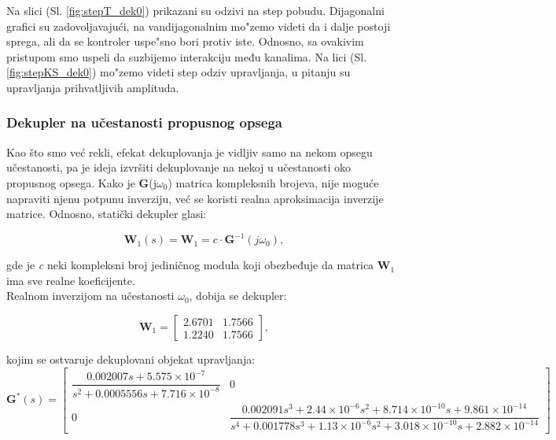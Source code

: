 \documentclass[a4paper,11pt]{article}
\theoremstyle{definition} \newtheorem{deff}{Definicija}[section]
\theoremstyle{definition} \newtheorem{prim}[deff]{Primer}
\theoremstyle{plain} \newtheorem{teor}[deff]{Teorema}
\begin{document}
	
	Na slici (Sl. \ref{fig:stepT_dek0}) prikazani su odzivi na step pobudu. Dijagonalni grafici su zadovoljavajući, na vandijagonalnim mo"zemo videti da i dalje postoji sprega, ali da se kontroler uspe"sno bori protiv iste. Odnosno, sa ovakivim pristupom smo uspeli da suzbijemo interakciju među kanalima. Na lici (Sl. \ref{fig:stepKS_dek0}) mo"zemo videti step odziv upravljanja, u pitanju su upravljanja prihvatljivih amplituda.
	
	
	\newpage
	
	
	\subsubsection{Dekupler na učestanosti propusnog opsega}
	
	Kao što smo već rekli, efekat dekuplovanja je vidljiv samo na nekom opsegu učestanosti, pa je ideja izvršiti dekuplovanje na nekoj u učestanosti oko propusnog opsega. 
	Kako je \textbf{G}(j$\omega_0$) matrica kompleksnih brojeva, nije moguće napraviti njenu potpunu inverziju, već se koristi realna aproksimacija inverzije matrice. Odnosno, statički dekupler glasi: 
	
	\begin{equation}
		\textbf{W}_1(s) = \textbf{W}_1 = c \cdot \textbf{G}^{-1}(j\omega_0), 
	\end{equation}
	
	\noindent gde je \textit{c} neki kompleksni broj jediničnog modula koji obezbeđuje da matrica $\textbf{W}_1$ ima sve realne koeficijente. \\
	
	\vspace{1cm}
	Realnom inverzijom na učestanosti $\omega_0$, dobija se dekupler:
	
	\begin{equation}
		\textbf{W}_1 = \begin{bmatrix} 2.6701  &  1.7566 \\  1.2240  &  1.7566 \end{bmatrix},
	\end{equation}
	
	\vspace{1cm}
	\noindent kojim se ostvaruje dekuplovani objekat upravljanja: \\
	
	\begin{equation}
		\textbf{G}^*(s) = \begin{bmatrix} 
			\dfrac{0.002007s + 5.575 \times 10^{-7}}{s^2 + 0.0005556s + 7.716 \times 10^{-8}} & 0 \\
			0 & \dfrac{0.002091s^3 + 2.44 \times 10^{-6}s^2 + 8.714 \times 10^{-10}s + 9.861 \times 10^{-14}}{s^4 + 0.001778s^3 + 1.13 \times 10^{-6}s^2 + 3.018 \times 10^{-10}s + 2.882 \times 10^{-14}}
		\end{bmatrix}
	\end{equation}
	
\end{document}

